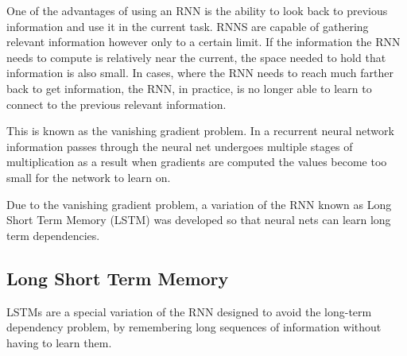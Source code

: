 One of the advantages of using an RNN is the ability to look back to previous information and use it in the current task. RNNS are capable of gathering relevant information however only to a certain limit. If the information the RNN needs to compute is relatively near the current, the space needed to hold that information is also small. In cases, where the RNN needs to reach much farther back to get information, the RNN, in practice, is no longer able to learn to connect to the previous relevant information. \cite{olah}

This is known as the vanishing gradient problem. In a recurrent neural network information passes through the neural net undergoes multiple stages of multiplication as a result when gradients are computed the values become too small for the network to learn on. \cite{nicholson}

Due to the vanishing gradient problem, a variation of the RNN known as Long Short Term Memory (LSTM) was developed so that neural nets can learn long term dependencies. 
\subsection{Long Short Term Memory}

LSTMs are a special variation of the RNN designed to avoid the long-term dependency problem, by remembering long sequences of information without having to learn them.

